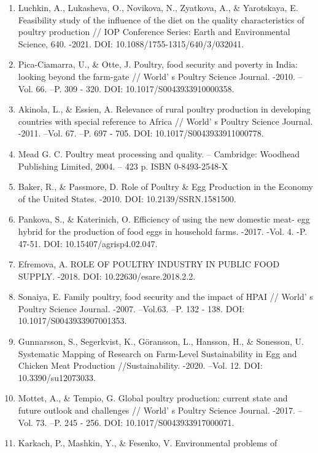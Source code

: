 \begin{enumerate}
\def\labelenumi{\arabic{enumi}.}
\setcounter{enumi}{2}
\item
  Luchkin, A., Lukasheva, O., Novikova, N., Zyatkova, A., \& Yarotskaya,
  E. Feasibility study of the influence of the diet on the quality
  characteristics of poultry production // IOP Conference Series: Earth
  and Environmental Science, 640. -2021. DOI:
  10.1088/1755-1315/640/3/032041.
\item
  Pica-Ciamarra, U., \& Otte, J. Poultry, food security and poverty in
  India: looking beyond the farm-gate // World' s Poultry
  Science Journal. -2010. --Vol. 66. --P. 309 - 320. DOI:
  10.1017/S0043933910000358.
\item
  Akinola, L., \& Essien, A. Relevance of rural poultry production in
  developing countries with special reference to Africa //
  World' s Poultry Science Journal. -2011. --Vol. 67.
  --P. 697 - 705. DOI: 10.1017/S0043933911000778.
\item
  Mead G. C. Poultry meat processing and quality. -- Cambridge: Woodhead
  Publishing Limited, 2004. -- 423 p. ISBN 0-8493-2548-X
\item
  Baker, R., \& Passmore, D. Role of Poultry \& Egg Production in the
  Economy of the United States. -2010. DOI: 10.2139/SSRN.1581500.
\item
  Pankova, S., \& Katerinich, O. Efficiency of using the new domestic
  meat- egg hybrid for the production of food eggs in household farms.
  -2017. -Vol. 4. -P. 47-51. DOI: 10.15407/agrisp4.02.047.
\item
  Efremova, A. ROLE OF POULTRY INDUSTRY IN PUBLIC FOOD SUPPLY. -2018.
  DOI: 10.22630/esare.2018.2.2.
\item
  Sonaiya, E. Family poultry, food security and the impact of HPAI //
  World' s Poultry Science Journal. -2007. --Vol.63. --P.
  132 - 138. DOI: 10.1017/S0043933907001353.
\item
  Gunnarsson, S., Segerkvist, K., Göransson, L., Hansson, H., \&
  Sonesson, U. Systematic Mapping of Research on Farm-Level
  Sustainability in Egg and Chicken Meat Production //Sustainability.
  -2020. --Vol. 12. DOI: 10.3390/su12073033.
\item
  Mottet, A., \& Tempio, G. Global poultry production: current state and
  future outlook and challenges // World' s Poultry
  Science Journal. -2017. --Vol. 73. --P. 245 - 256. DOI:
  10.1017/S0043933917000071.
\item
  Karkach, P., Mashkin, Y., \& Fesenko, V. Environmental problems of

\end{enumerate}
